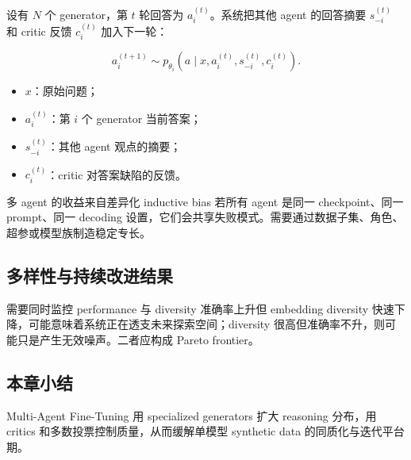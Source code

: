 设有 $N$ 个 generator，第 $t$ 轮回答为 $a_i^{(t)}$。系统把其他 agent 的回答摘要 $s_{-i}^{(t)}$ 和 critic 反馈 $c_i^{(t)}$ 加入下一轮：

$$
a_i^{(t+1)}\sim p_{\theta_i}
\left(a\mid x,a_i^{(t)},s_{-i}^{(t)},c_i^{(t)}\right).
$$

\begin{itemize}
    \item $x$：原始问题；
    \item $a_i^{(t)}$：第 $i$ 个 generator 当前答案；
    \item $s_{-i}^{(t)}$：其他 agent 观点的摘要；
    \item $c_i^{(t)}$：critic 对答案缺陷的反馈。
\end{itemize}


\begin{importantbox}{多 agent 的收益来自差异化 inductive bias}
若所有 agent 是同一 checkpoint、同一 prompt、同一 decoding 设置，它们会共享失败模式。需要通过数据子集、角色、超参或模型族制造稳定专长。
\end{importantbox}

\subsection{多样性与持续改进结果}




\begin{knowledgebox}{需要同时监控 performance 与 diversity}
准确率上升但 embedding diversity 快速下降，可能意味着系统正在透支未来探索空间；diversity 很高但准确率不升，则可能只是产生无效噪声。二者应构成 Pareto frontier。
\end{knowledgebox}

\subsection{本章小结}

Multi-Agent Fine-Tuning 用 specialized generators 扩大 reasoning 分布，用 critics 和多数投票控制质量，从而缓解单模型 synthetic data 的同质化与迭代平台期。

